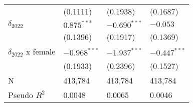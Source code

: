 \begin{tabular}{llll}
                           &           (0.1111) &           (0.1938) &           (0.1687) \\
$\delta_{2022}$            &      $0.875^{***}$ &     $-0.690^{***}$ &           $-0.053$ \\
                           &           (0.1396) &           (0.1917) &           (0.1369) \\
$\delta_{2022}$ x female   &     $-0.968^{***}$ &     $-1.937^{***}$ &     $-0.447^{***}$ \\
                           &           (0.1933) &           (0.2396) &           (0.1527) \\
N                          &            413,784 &            413,784 &            413,784 \\
Pseudo $R^2$               &             0.0048 &             0.0065 &             0.0046 \\
\bottomrule
\end{tabular}
